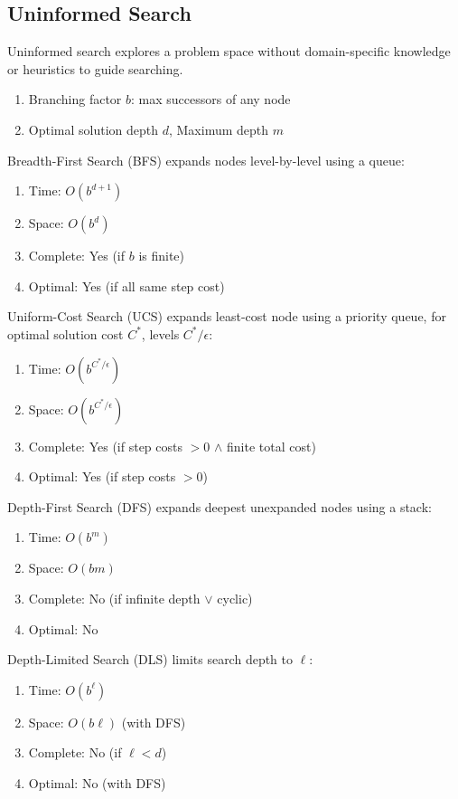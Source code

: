 \documentclass[12pt, a4paper]{article}
\begin{document}
\begin{multicols*}{3}
\subsection{Uninformed Search}
Uninformed search explores a problem space without domain-specific knowledge or heuristics to guide searching.
\begin{enumerate}[\roman*.]
  \item Branching factor $b$: max successors of any node 
  \item Optimal solution depth $d$, Maximum depth $m$ 
\end{enumerate}

Breadth-First Search (BFS) expands nodes level-by-level using a queue:
\begin{enumerate}[\roman*.]
  \item Time: $O(b^{d+1})$ 
  \item Space: $O(b^d)$
  \item Complete: Yes (if $b$ is finite)
  \item Optimal: Yes (if all same step cost)
\end{enumerate}

Uniform-Cost Search (UCS) expands least-cost node using a priority queue, for optimal solution cost $C^*$, levels $C^* /\epsilon$:
\begin{enumerate}[\roman*.]
  \item Time: $O(b^{C^*/ \epsilon})$ 
  \item Space: $O(b^{C^* /\epsilon})$
  \item Complete: Yes (if step costs $> 0$ $\land$ finite total cost)
  \item Optimal: Yes (if step costs $> 0$)
\end{enumerate}

Depth-First Search (DFS) expands deepest unexpanded nodes using a stack:
\begin{enumerate}[\roman*.]
  \item Time: $O(b^{m})$ 
  \item Space: $O(bm)$
  \item Complete: No (if infinite depth $\lor$ cyclic)
  \item Optimal: No 
\end{enumerate}

Depth-Limited Search (DLS) limits search depth to $\ell$:
\begin{enumerate}[\roman*.]
  \item Time: $O(b^{\ell})$ 
  \item Space: $O(b\ell)$ (with DFS)
  \item Complete: No (if $\ell < d$)
  \item Optimal: No (with DFS)
\end{enumerate}


\end{multicols*}
\end{document}
